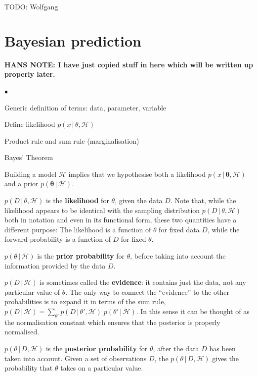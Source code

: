 \documentclass[11pt]{article}
\newenvironment{mtemize}{
  \begin{list}{$\bullet$}
    {\setlength{\itemsep}{0pt}
     \setlength{\leftmargin}{3ex}
    }
  }
  {\end{list}}
\newcommand{\hmod}  {{\mathcal{H}}}  %
\newcommand{\cond}{\,|\,}
\newcommand{\bmtheta}{{\bm{\theta}}}
\begin{document}
TODO: Wolfgang

\section{Bayesian prediction}

\textbf{HANS NOTE: I have just copied stuff in here which will be
  written up properly later.}
\begin{mtemize}
\item Generic definition of terms: data, parameter, variable
\item Define likelihood $p(x\cond\theta,\hmod)$
\item Product rule and sum rule (marginalisation)
\item Bayes' Theorem

\item Building a model $\hmod$ implies that we hypothesise both a
  likelihood $p(x\cond\bmtheta,\hmod)$ and a prior
  $p(\bmtheta\cond\hmod)$.

\item $p(D\cond\theta,\hmod)$ is the \textbf{likelihood} for $\theta$,
  given the data $D$. Note that, while the likelihood appears to be
  identical with the sampling distribution $p(D\cond\theta,\hmod)$
  both in notation and even in its functional form, these two
  quantities have a different purpose: The likelihood is a function of
  $\theta$ for fixed data $D$, while the forward probability is a
  function of $D$ for fixed $\theta$.

\item $p(\theta\cond\hmod)$ is the \textbf{prior probability} for
  $\theta$, before taking into account the information provided by the
  data $D$.

\item $p(D\cond\hmod)$ is sometimes called the \textbf{evidence}: it
  contains just the data, not any particular value of $\theta$. The
  only way to connect the ``evidence'' to the other probabilities is
  to expand it in terms of the sum rule, $p(D\cond\hmod) =
  \sum_{\theta'} p(D\cond\theta',\hmod)\;p(\theta'\cond\hmod)$. In
  this sense it can be thought of as the normalisation constant which
  ensures that the posterior is properly normalised.


\item $p(\theta\cond D,\hmod)$ is the \textbf{posterior probability}
  for $\theta$, after the data $D$ has been taken into account. Given
  a set of observations $D$, the $p(\theta\cond D,\hmod)$ gives the
  probability that $\theta$ takes on a particular value.


\end{mtemize}
\end{document}
